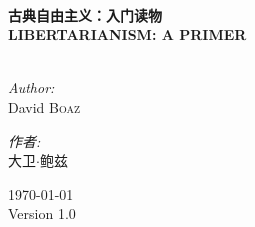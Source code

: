 \begin{titlepage}
\begin{center}
\HRule \\[0.4cm]
{ \huge \bfseries 古典自由主义：入门读物\\LIBERTARIANISM: A PRIMER \\[0.4cm] }
\HRule \\[1.5cm]

\noindent
\begin{minipage}[t]{0.4\textwidth}
	\begin{flushleft} \large
		\emph{Author:}\\
		David \textsc{Boaz}
	\end{flushleft}
\end{minipage}%
\begin{minipage}[t]{0.4\textwidth}
	\begin{flushleft} \large
		\emph{作者:}\\
		\textsc{大卫$\cdot$鲍兹}
	\end{flushleft}
\end{minipage}%

\vfill

{\large \today \\Version 1.0}
\end{center}
\end{titlepage}